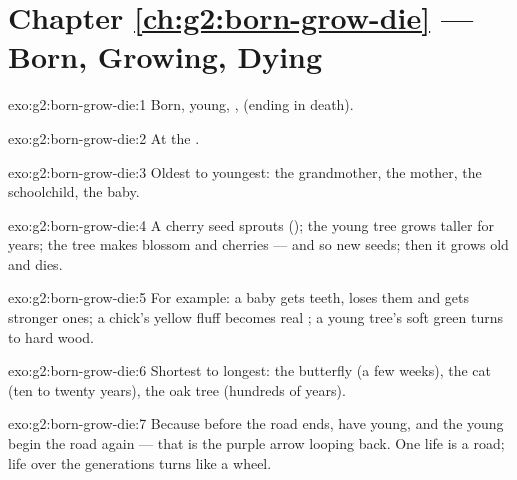 \section*{Chapter \ref{ch:g2:born-grow-die} --- Born, Growing, Dying}

\begin{solution}{exo:g2:born-grow-die:1}
Born, young, ,  (ending in death).
\end{solution}

\begin{solution}{exo:g2:born-grow-die:2}
At the  .
\end{solution}

\begin{solution}{exo:g2:born-grow-die:3}
Oldest to youngest: the grandmother, the mother, the schoolchild,
the baby.
\end{solution}

\begin{solution}{exo:g2:born-grow-die:4}
A cherry seed sprouts (); the young tree grows taller for
years; the  tree makes blossom and cherries --- and so new
seeds; then it grows old and dies.
\end{solution}

\begin{solution}{exo:g2:born-grow-die:5}
For example: a baby gets teeth, loses them and gets stronger ones;
a chick's yellow fluff becomes real ; a young tree's soft
green  turns to hard wood.
\end{solution}

\begin{solution}{exo:g2:born-grow-die:6}
Shortest to longest: the butterfly (a few weeks), the cat (ten to
twenty years), the oak tree (hundreds of years).
\end{solution}

\begin{solution}{exo:g2:born-grow-die:7}
Because before the road ends,  have young, and the young
begin the road again --- that is the purple arrow looping back.
One life is a road; life over the generations turns like a wheel.
\end{solution}

